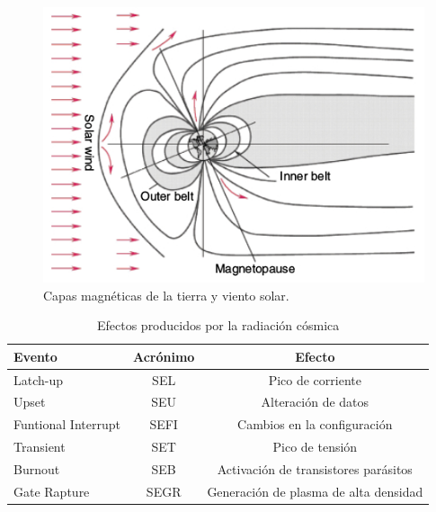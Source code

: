 \begin{figure}[htbp]
	\centering
	\includegraphics[width=.8\textwidth]{./Figures/vientosolar.jpg}
    \caption{Capas magnéticas de la tierra y viento solar\citep{WEBSITE:structure_space_radiation}.}
	\label{fig:viento}
\end{figure}

\begin{table}[h]
	\centering
	\caption[Efectos de la radiación cósmica]{Efectos producidos por la radiación cósmica\citep{WEBSITE:structure_space_radiation}}
	\begin{tabular}{l c c}    
		\toprule
		\textbf{Evento}      & \textbf{Acrónimo} & \textbf{Efecto}\\
		\midrule
		Latch-up             & SEL               & Pico de corriente\\		
		Upset                & SEU               & Alteración de datos\\
		Funtional Interrupt  & SEFI              & Cambios en la configuración\\
		Transient            & SET               & Pico de tensión\\
		Burnout              & SEB               & Activación de transistores parásitos\\
		Gate Rapture         & SEGR              & Generación de plasma de alta densidad\\
		\bottomrule
		\hline
	\end{tabular}
	\label{tab:radiacion}
\end{table}

